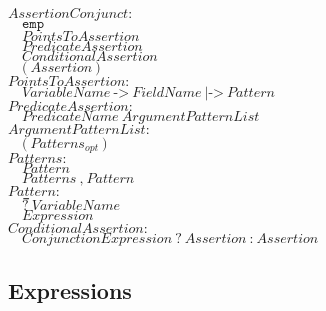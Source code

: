 \documentclass{article}
\begin{document}
\begin{flushleft}
$\mathit{AssertionConjunct{:}}$\\
$\quad \texttt{emp}$\\
$\quad \mathit{PointsToAssertion}$\\
$\quad \mathit{PredicateAssertion}$\\
$\quad \mathit{ConditionalAssertion}$\\
$\quad \texttt{(}\ \mathit{Assertion}\ \texttt{)}$\\[5pt]

$\mathit{PointsToAssertion{:}}$\\
$\quad \mathit{VariableName}\ \texttt{->}\ \mathit{FieldName}\ \texttt{|->}\ \mathit{Pattern}$\\[5pt]

$\mathit{PredicateAssertion{:}}$\\
$\quad \mathit{PredicateName}\ \mathit{ArgumentPatternList}$\\[5pt]

$\mathit{ArgumentPatternList{:}}$\\
$\quad \texttt{(}\ \mathit{Patterns}_\mathit{opt}\ \texttt{)}$\\[5pt]

$\mathit{Patterns{:}}$\\
$\quad \mathit{Pattern}$\\
$\quad \mathit{Patterns}\ \texttt{,}\ \mathit{Pattern}$\\[5pt]

$\mathit{Pattern{:}}$\\
$\quad \texttt{\symbol{95}}$\\
$\quad \texttt{?}\ \mathit{VariableName}$\\
$\quad \mathit{Expression}$\\[5pt]

$\mathit{ConditionalAssertion{:}}$\\
$\quad \mathit{ConjunctionExpression}\ \texttt{?}\ \mathit{Assertion}\ \texttt{:}\ \mathit{Assertion}$\\
\end{flushleft}

\subsection{Expressions}
\end{document}
